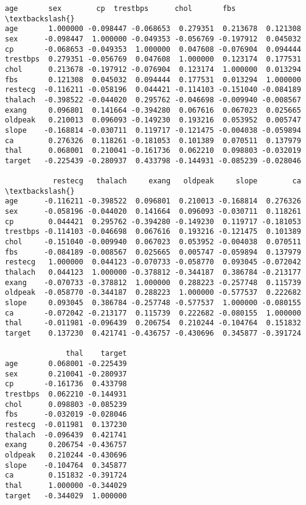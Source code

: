 \documentclass[11pt]{article}
\makeatletter
\newcommand{\boxspacing}{\kern\kvtcb@left@rule\kern\kvtcb@boxsep}
\newcommand{\prompt}[4]{
        \ttfamily\llap{{\color{#2}[#3]:\hspace{3pt}#4}}\vspace{-\baselineskip}
    }
\makeatother
\begin{document}
            \begin{tcolorbox}[breakable, size=fbox, boxrule=.5pt, pad at break*=1mm, opacityfill=0]
\prompt{Out}{outcolor}{22}{\boxspacing}
\begin{Verbatim}[commandchars=\\\{\}]
               age       sex        cp  trestbps      chol       fbs  \textbackslash{}
age       1.000000 -0.098447 -0.068653  0.279351  0.213678  0.121308
sex      -0.098447  1.000000 -0.049353 -0.056769 -0.197912  0.045032
cp       -0.068653 -0.049353  1.000000  0.047608 -0.076904  0.094444
trestbps  0.279351 -0.056769  0.047608  1.000000  0.123174  0.177531
chol      0.213678 -0.197912 -0.076904  0.123174  1.000000  0.013294
fbs       0.121308  0.045032  0.094444  0.177531  0.013294  1.000000
restecg  -0.116211 -0.058196  0.044421 -0.114103 -0.151040 -0.084189
thalach  -0.398522 -0.044020  0.295762 -0.046698 -0.009940 -0.008567
exang     0.096801  0.141664 -0.394280  0.067616  0.067023  0.025665
oldpeak   0.210013  0.096093 -0.149230  0.193216  0.053952  0.005747
slope    -0.168814 -0.030711  0.119717 -0.121475 -0.004038 -0.059894
ca        0.276326  0.118261 -0.181053  0.101389  0.070511  0.137979
thal      0.068001  0.210041 -0.161736  0.062210  0.098803 -0.032019
target   -0.225439 -0.280937  0.433798 -0.144931 -0.085239 -0.028046

           restecg   thalach     exang   oldpeak     slope        ca  \textbackslash{}
age      -0.116211 -0.398522  0.096801  0.210013 -0.168814  0.276326
sex      -0.058196 -0.044020  0.141664  0.096093 -0.030711  0.118261
cp        0.044421  0.295762 -0.394280 -0.149230  0.119717 -0.181053
trestbps -0.114103 -0.046698  0.067616  0.193216 -0.121475  0.101389
chol     -0.151040 -0.009940  0.067023  0.053952 -0.004038  0.070511
fbs      -0.084189 -0.008567  0.025665  0.005747 -0.059894  0.137979
restecg   1.000000  0.044123 -0.070733 -0.058770  0.093045 -0.072042
thalach   0.044123  1.000000 -0.378812 -0.344187  0.386784 -0.213177
exang    -0.070733 -0.378812  1.000000  0.288223 -0.257748  0.115739
oldpeak  -0.058770 -0.344187  0.288223  1.000000 -0.577537  0.222682
slope     0.093045  0.386784 -0.257748 -0.577537  1.000000 -0.080155
ca       -0.072042 -0.213177  0.115739  0.222682 -0.080155  1.000000
thal     -0.011981 -0.096439  0.206754  0.210244 -0.104764  0.151832
target    0.137230  0.421741 -0.436757 -0.430696  0.345877 -0.391724

              thal    target
age       0.068001 -0.225439
sex       0.210041 -0.280937
cp       -0.161736  0.433798
trestbps  0.062210 -0.144931
chol      0.098803 -0.085239
fbs      -0.032019 -0.028046
restecg  -0.011981  0.137230
thalach  -0.096439  0.421741
exang     0.206754 -0.436757
oldpeak   0.210244 -0.430696
slope    -0.104764  0.345877
ca        0.151832 -0.391724
thal      1.000000 -0.344029
target   -0.344029  1.000000
\end{Verbatim}
\end{tcolorbox}
        
\end{document}
